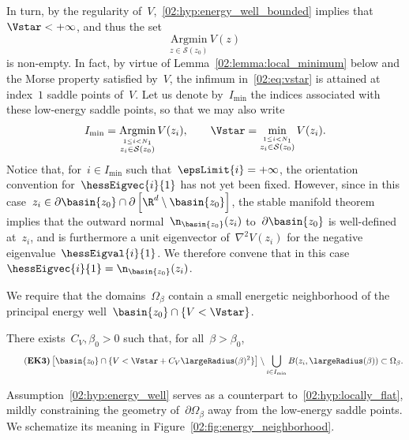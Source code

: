     In turn, by the regularity of~$V$,~\eqref{02:hyp:energy_well_bounded} implies that~$\Vstar<+\infty$, and thus the set
    \begin{equation}
        \underset{z\in\mathcal S(z_0)}{\mathrm{Argmin}}\,V(z)
    \end{equation}
    is non-empty. In fact, by virtue of Lemma~\ref{02:lemma:local_minimum} below and the Morse property satisfied by~$V$, the infimum in~\eqref{02:eq:vstar} is attained at index~$1$ saddle points of~$V$. Let us denote by~$I_{\mathrm{min}}$ the indices associated with these low-energy saddle points, so that we may also write
    \begin{equation}
        \label{02:eq:vstar_bis}
        I_{\min} = \underset{\stackrel{1\leq i < N_1}{z_i\in\mathcal S(z_0)}}{\mathrm{Argmin}}\,V(z_i),\qquad \Vstar = \underset{\stackrel{1\leq i < N_1}{z_i\in\mathcal S(z_0)}}{\min}\,V(z_i).
    \end{equation}
    Notice that, for~$i\in I_{\min}$ such that~$\epsLimit{i} = +\infty$, the orientation convention for~$\hessEigvec{i}{1}$ has not yet been fixed. However, since in this case~$z_i \in \partial \basin{z_0} \cap \partial\left[\R^d\setminus \basin{z_0}\right]$, the stable manifold theorem implies that the outward normal~$\n_{\basin{z_0}}(z_i)$ to~$\partial\basin{z_0}$ is well-defined at~$z_i$, and is furthermore a unit  eigenvector of~$\nabla^2 V(z_i)$ for the negative eigenvalue~$\hessEigval{i}{1}$.
    We therefore convene that in this case~$\hessEigvec{i}{1}=\n_{\basin{z_0}}(z_i)$.

    We require that the domains~$\Omega_\beta$ contain a small energetic neighborhood of the principal energy well~$\basin{z_0}\cap\{V<\Vstar\}$.
    \begin{hypothesis}
        There exists~$C_V,\beta_0>0$ such that, for all~$\beta>\beta_0$,
        \begin{equation}
            \tag{\bf EK3}
            \label{02:hyp:energy_well}
            \left[\basin{z_0}\cap\{V<\Vstar+C_V\largeRadius(\beta)^2\}\right]\setminus \bigcup_{i\in I_{\min}} B(z_i,\largeRadius(\beta)) \subset \Omega_\beta.
        \end{equation}
    \end{hypothesis}
    Assumption~\eqref{02:hyp:energy_well} serves as a counterpart to~\eqref{02:hyp:locally_flat}, mildly constraining the geometry of~$\partial\Omega_\beta$ away from the low-energy saddle points.
    We schematize its meaning in Figure~\ref{02:fig:energy_neighborhood}.

